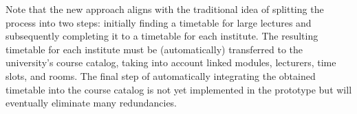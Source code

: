 \documentclass{easychair}
\begin{document}
  Note that the new approach aligns with the traditional idea of splitting the process into two steps: initially finding a timetable for large lectures and subsequently completing it to a timetable for each institute.
  The resulting timetable for each institute must be (automatically) transferred to the university's course catalog, taking into account linked modules, lecturers, time slots, and rooms.
  The final step of automatically integrating the obtained timetable into the course catalog is not yet implemented in the prototype but will eventually eliminate many redundancies.


\end{document}

